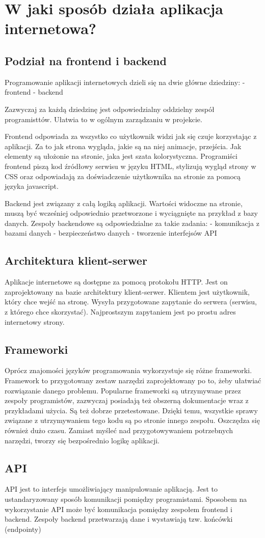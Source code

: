 \section{W jaki sposób działa aplikacja internetowa?}

\subsection{Podział na frontend i backend}
Programowanie aplikacji internetowych dzieli się na dwie główne dziedziny:
- frontend
- backend

Zazwyczaj za każdą dziedzinę jest odpowiedzialny oddzielny zespół programisttów. Ułatwia to w ogólnym zarządzaniu w projekcie.

Frontend odpowiada za wszystko co użytkownik widzi jak się czuje korzystając z aplikacji. Za to jak strona wygląda, jakie są na niej animacje, przejścia. Jak elementy są ułożonie na stronie, jaka jest szata kolorystyczna. Programiści frontend piszą kod źródłowy serwisu w języku HTML, stylizują wygląd strony w CSS oraz odpowiadają za doświadczenie użytkownika na stronie za pomocą języka javascript.


Backend jest związany z całą logiką aplikacji. Wartości widoczne na stronie, muszą być wcześniej odpowiednio przetworzone i wyciągnięte na przykład z bazy danych. Zespoły backendowe są odpowiedzialne za takie zadania:
- komunikacja z bazami danych
- bezpieczeństwo danych
- tworzenie interfejsów API


\subsection{Architektura klient-serwer}
Aplikacje internetowe są dostępne za pomocą protokołu HTTP. Jest on zaprojektowany na bazie architektury klient-serwer. Klientem jest użytkownik, który chce wejść na stronę. Wysyła przygotowane zapytanie do serwera (serwisu, z którego chce skorzystać). Najprostszym zapytaniem jest po prostu adres internetowy strony.

\subsection{Frameworki}
Oprócz znajomości języków programowania wykorzystuje się różne frameworki. Framework to przygotowany zestaw narzędzi zaprojektowany po to, żeby ułatwiać rozwiązanie danego problemu. Popularne frameworki są utrzymywane przez zespoły programistów, zazwyczaj posiadają też obszerną dokumentacje wraz z przykładami użycia. Są też dobrze przetestowane. Dzięki temu, wszystkie sprawy związane z utrzymywaniem tego kodu są po stronie innego zespołu. Oszczędza się również dużo czasu. Zamiast myśleć nad przygotowywaniem potrzebnych narzędzi, tworzy się bezpośrednio logikę aplikacji. 

\subsection{API}
API jest to interfejs umożliwiający manipulowanie aplikacją. Jest to ustandaryzowany sposób komunikacji pomiędzy programistami. Sposobem na wykorzystanie API może być komunikacja pomiędzy zespołem frontend i backend. Zespoły backend przetwarzają dane i wystawiają tzw. końcówki (endpointy)
